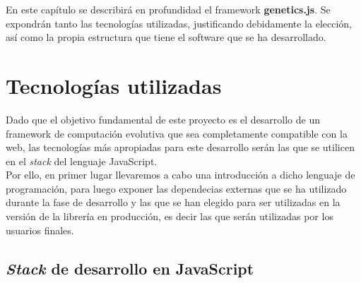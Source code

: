 



En este capítulo se describirá en profundidad el framework \textbf{genetics.js}. Se expondrán tanto las tecnologías utilizadas, justificando debidamente la elección, así como la propia estructura que tiene el software que se ha desarrollado.

\section{Tecnologías utilizadas}
\label{4:sec:1}

Dado que el objetivo fundamental de este proyecto es el desarrollo de un framework de computación evolutiva que sea completamente compatible con la web, las tecnologías más apropiadas para este desarrollo serán las que se utilicen en el \textit{stack} del lenguaje JavaScript. \\

Por ello, en primer lugar llevaremos a cabo una introducción a dicho lenguaje de programación, para luego exponer las dependecias externas que se ha utilizado durante la fase de desarrollo y las que se han elegido para ser utilizadas en la versión de la librería en producción, es decir las que serán utilizadas por los usuarios finales. 

\subsection{\textit{Stack} de desarrollo en JavaScript}

